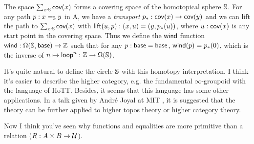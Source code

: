The space $\sum_{x:\mathbb{S}}\text{\sf cov}(x)$ forms a covering space of
the homotopical sphere $\mathbb{S}$. For any path $p:x=_{\mathbb{S}} y$ in A,
we have a {\it transport} $p_\ast:\text{\sf cov}(x)\to \text{\sf cov}(y)$ and
we can lift the path to $\sum_{x:\mathbb{S}}\text{\sf cov}(x)$ with
\newcommand{\lift}{\name{lift}}
$\lift(u,p):(x,u)=(y,p_\ast(u))$, where $u: \text{\sf cov}(x)$ is any
start point in the covering space. Thus we define the $\text{\sf wind}$
function $\text{\sf wind}: \Omega(\mathbb{S},\text{\sf base})\to\mathbb{Z}$ such that
for any $p:\text{\sf base}=\text{\sf base}$, $\text{\sf wind}(p)=p_\ast(0)$, which is the
inverse of $n\mapsto \text{\sf loop}^n: \mathbb{Z}\to\Omega(\mathbb{S})$.

It's quite natural to define the circle $\mathbb{S}$ with this homotopy
interpretation. I think it's easier to describe the higher category,
e.g. the fundamental $\infty$-groupoid with the language of HoTT. 
Besides, it seems that this language has some other applications.
In a talk given by Andr\'e Joyal at MIT \cite{joyal2014categorical}, 
it is suggested that the theory can be further applied to higher topos 
theory or higher category theory.

Now I think you've seen why functions and equalities are more
primitive than a relation ($R:A\times B\to \mathcal{U}$).
